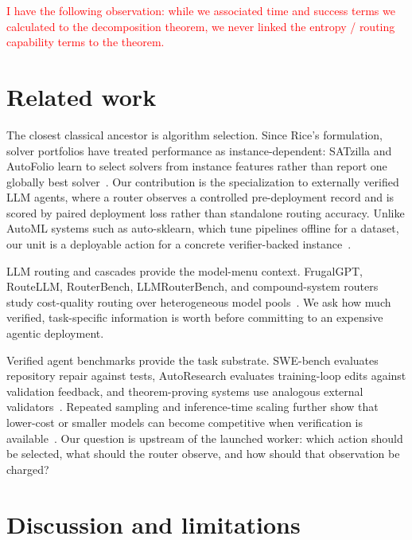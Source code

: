 \documentclass{article}
\newcounter{algorithm}
\begin{document}
\textcolor{red}{I have the following observation: while we associated time and success terms we calculated to the decomposition theorem, we never linked the entropy / routing capability terms to the theorem.}

\section{Related work}
\label{sec:related}

The closest classical ancestor is algorithm selection.
Since Rice's formulation, solver portfolios have treated performance as instance-dependent: SATzilla and AutoFolio learn to select solvers from instance features rather than report one globally best solver~\citep{rice1976algorithm,xu2012satzilla,lindauer2015autofolio,kotthoff2016algorithm}.
Our contribution is the specialization to externally verified LLM agents, where a router observes a controlled pre-deployment record and is scored by paired deployment loss rather than standalone routing accuracy.
Unlike AutoML systems such as auto-sklearn, which tune pipelines offline for a dataset, our unit is a deployable action for a concrete verifier-backed instance~\citep{feurer2015autosklearn}.

LLM routing and cascades provide the model-menu context.
FrugalGPT, RouteLLM, RouterBench, LLMRouterBench, and compound-system routers study cost-quality routing over heterogeneous model pools~\citep{chen2023frugalgpt,ong2024routellm,hu2024routerbench,anonymous2026llmrouterbench,chen2025optimizing,yue2025masrouter,zaharia2024compound}.
We ask how much verified, task-specific information is worth before committing to an expensive agentic deployment.

Verified agent benchmarks provide the task substrate.
SWE-bench evaluates repository repair against tests, AutoResearch evaluates training-loop edits against validation feedback, and theorem-proving systems use analogous external validators~\citep{jimenez2024swebench,karpathy2026autoresearch}.
Repeated sampling and inference-time scaling further show that lower-cost or smaller models can become competitive when verification is available~\citep{brown2024monkeys,snell2025testtime,wu2025inference,osca2024}.
Our question is upstream of the launched worker: which action should be selected, what should the router observe, and how should that observation be charged?

\section{Discussion and limitations}
\label{sec:discussion}
\end{document}
